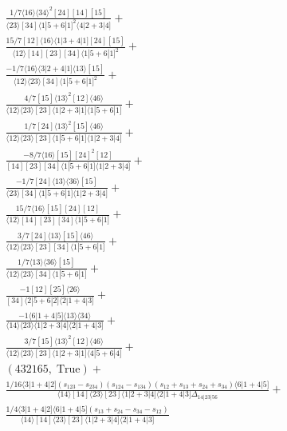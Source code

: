 \documentclass[varwidth, border=5pt]{standalone}
\begin{document}
\begin{my}
$\begin{gathered}
\scriptscriptstyle\frac{1/7⟨16⟩⟨34⟩^2[24][14][15]}{⟨23⟩[34]⟨1|5+6|1]^2⟨4|2+3|4]}+\\
\scriptscriptstyle\frac{15/7[12]⟨16⟩⟨1|3+4|1][24][15]}{⟨12⟩[14][23][34]⟨1|5+6|1]^2}+\\
\scriptscriptstyle\frac{-1/7⟨16⟩⟨3|2+4|1]⟨13⟩[15]}{⟨12⟩⟨23⟩[34]⟨1|5+6|1]^2}+\\
\scriptscriptstyle\frac{4/7[15]⟨13⟩^2[12]⟨46⟩}{⟨12⟩⟨23⟩[23]⟨1|2+3|1]⟨1|5+6|1]}+\\
\scriptscriptstyle\frac{1/7[24]⟨13⟩^2[15]⟨46⟩}{⟨12⟩⟨23⟩[23]⟨1|5+6|1]⟨1|2+3|4]}+\\
\scriptscriptstyle\frac{-8/7⟨16⟩[15][24]^2[12]}{[14][23][34]⟨1|5+6|1]⟨1|2+3|4]}+\\
\scriptscriptstyle\frac{-1/7[24]⟨13⟩⟨36⟩[15]}{⟨23⟩[34]⟨1|5+6|1]⟨1|2+3|4]}+\\
\scriptscriptstyle\frac{15/7⟨16⟩[15][24][12]}{⟨12⟩[14][23][34]⟨1|5+6|1]}+\\
\scriptscriptstyle\frac{3/7[24]⟨13⟩[15]⟨46⟩}{⟨12⟩⟨23⟩[23][34]⟨1|5+6|1]}+\\
\scriptscriptstyle\frac{1/7⟨13⟩⟨36⟩[15]}{⟨12⟩⟨23⟩[34]⟨1|5+6|1]}+\\
\scriptscriptstyle\frac{-1[12][25]⟨26⟩}{[34]⟨2|5+6|2]⟨2|1+4|3]}+\\
\scriptscriptstyle\frac{-1⟨6|1+4|5]⟨13⟩⟨34⟩}{⟨14⟩⟨23⟩⟨1|2+3|4]⟨2|1+4|3]}+\\
\scriptscriptstyle\frac{3/7[15]⟨13⟩^2[12]⟨46⟩}{⟨12⟩⟨23⟩[23]⟨1|2+3|1]⟨4|5+6|4]}+\\
\scriptscriptstyle(432165,\;\text{True})+\\
\scriptscriptstyle\frac{1/16⟨3|1+4|2](s_{123}-s_{234})(s_{124}-s_{134})(s_{12}+s_{13}+s_{24}+s_{34})⟨6|1+4|5]}{⟨14⟩[14]⟨23⟩[23]⟨1|2+3|4]⟨2|1+4|3]Δ_{14|23|56}}+\\
\scriptscriptstyle\frac{1/4⟨3|1+4|2]⟨6|1+4|5](s_{13}+s_{24}-s_{34}-s_{12})}{⟨14⟩[14]⟨23⟩[23]⟨1|2+3|4]⟨2|1+4|3]}\phantom{+}
\end{gathered}$
\end{my}
\end{document}
